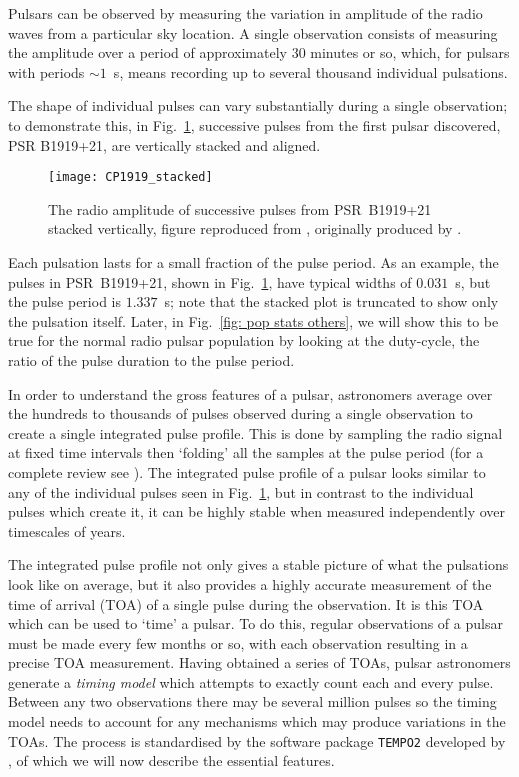 Pulsars can be observed by measuring the variation in amplitude of the radio
waves from a particular sky location. A single observation consists of measuring
the amplitude over a period of approximately $30$ minutes or so, which, for pulsars
with periods $\sim 1$~s, means recording up to several thousand individual pulsations.

The shape of individual pulses can vary substantially during a single
observation; to demonstrate this, in Fig.~\ref{fig: CP1919 stacked}, successive pulses
from the first pulsar discovered, PSR B1919+21, are vertically stacked and
aligned.
\begin{figure}[htb]
\centering
\texttt{[image: CP1919\_stacked]}
\caption{The radio amplitude of successive pulses from PSR~B1919+21 stacked
vertically, figure reproduced from \citet{mitton1977cambridge}, originally
produced by \citet{craft1970}.}
\label{fig: CP1919 stacked}
\end{figure}
Each pulsation lasts for a small fraction of the pulse period. As an example,
the pulses in PSR~B1919+21, shown in Fig.~\ref{fig: CP1919 stacked}, have
typical widths of $0.031$~s, but the pulse period is $1.337$~s; note that the
stacked plot is truncated to show only the pulsation itself. Later,
in Fig.~\ref{fig: pop stats others}, we will show this to be true for the
normal radio pulsar population by looking at the duty-cycle, the ratio of the
pulse duration to the pulse period.

In order to understand the gross features of a pulsar, astronomers average over
the hundreds to thousands of pulses observed during a single observation to
create a single integrated pulse profile. This is done by sampling the radio
signal at fixed time intervals then `folding' all the samples at the pulse
period (for a complete review see \citet{Lyne2012book}). The integrated pulse
profile of a pulsar looks similar to any of the individual pulses seen in
Fig.~\ref{fig: CP1919 stacked}, but in contrast to the individual pulses which
create it, it can be highly stable when measured independently over timescales
of years.

The integrated pulse profile not only gives a stable picture of what the
pulsations look like on average, but it also provides a highly accurate
measurement of the time of arrival (TOA) of a single pulse during the
observation. It is this TOA
which can be used to `time' a pulsar. To do this, regular observations of a
pulsar must be made every few months or so, with each observation resulting in a
precise TOA measurement. Having obtained a series of TOAs, pulsar astronomers
generate a \emph{timing model} which attempts to exactly count each and every
pulse. Between any two observations there may be several million pulses so the
timing model needs to account for any mechanisms which may produce variations
in the TOAs.  The process is standardised by the software package
\texttt{TEMPO2} developed by \citet{Hobbs2006}, of which we will now describe the
essential features.

